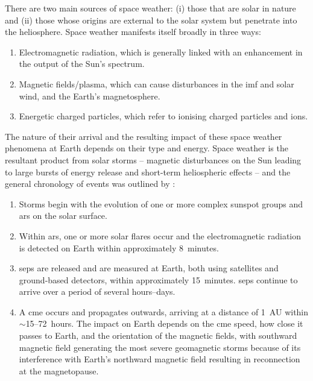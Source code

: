 There are two main sources of space weather: (i) those that are solar in nature and (ii) those whose origins are external to the solar system but penetrate into the heliosphere. Space weather manifests itself broadly in three ways:

\begin{enumerate}
	\item{Electromagnetic radiation, which is generally linked with an enhancement in the output of the Sun's spectrum.}
	
	\item{Magnetic fields/plasma, which can cause disturbances in the \gls{imf} and solar wind, and the Earth's magnetosphere.}
	
	\item{Energetic charged particles, which refer to ionising charged particles and ions.}
\end{enumerate}

The nature of their arrival and the resulting impact of these space weather phenomena at Earth depends on their type and energy. Space weather is the resultant product from solar storms -- magnetic disturbances on the Sun leading to large bursts of energy release and short-term heliospheric effects -- and the general chronology of events was outlined by \citet{cannon_extreme_2013}:

\begin{enumerate}
	\item{Storms begin with the evolution of one or more complex sunspot groups and \glspl{ar} on the solar surface.}
	
	\item{Within \glspl{ar}, one or more solar flares occur and the electromagnetic radiation is detected on Earth within approximately 8~minutes.}
	
	\item{\glspl{sep} are released and are measured at Earth, both using satellites and ground-based detectors, within approximately 15~minutes. \glspl{sep} continue to arrive over a period of several hours--days.}
	
	\item{A \gls{cme} occurs and propagates outwards, arriving at a distance of 1~AU within $\sim$15--72~hours. The impact on Earth depends on the \gls{cme} speed, how close it passes to Earth, and the orientation of the magnetic fields, with southward magnetic field generating the most severe geomagnetic storms because of its interference with Earth's northward magnetic field resulting in reconnection at the magnetopause.}
	
\end{enumerate}

